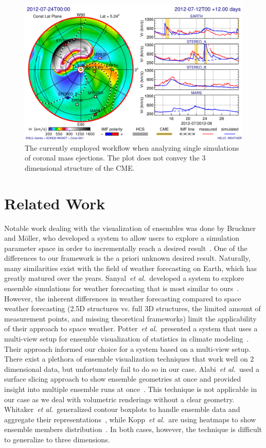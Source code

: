 \documentclass[journal]{vgtc}                %
\def\etal{\textit{et al.}}
\begin{document}
\begin{figure}
\newcommand{\abImageWidth}{0.9\columnwidth}
\centering
\includegraphics[width=\abImageWidth]{figures/current_workflow.png}
\caption{The currently employed workflow when analyzing single simulations of coronal mass ejections. The plot does not convey the 3 dimensional structure of the CME.}
\label{fig:currentworkflow:single}
\end{figure}

\section{Related Work}
 Notable work dealing with the visualization of ensembles was done by Bruckner and M\"oller, who developed a system to allow users to explore a simulation parameter space in order to incrementally reach a desired result~\cite{bruckner2010result}. One of the differences to our framework is the a priori unknown desired result. Naturally, many similarities exist with the field of weather forecasting on Earth, which has greatly matured over the years. Sanyal~\etal\ developed a system to explore ensemble simulations for weather forecasting that is most similar to ours~\cite{sanyal2010noodles}. However, the inherent differences in weather forecasting compared to space weather forecasting (2.5D structures vs. full 3D structures, the limited amount of measurement points, and missing theoretical frameworks) limit the applicability of their approach to space weather. Potter~\etal\ presented a system that uses a multi-view setup for ensemble visualization of statistics in climate modeling~\cite{potter2009ensemble}. Their approach informed our choice for a system based on a multi-view setup. There exist a plethora of ensemble visualization techniques that work well on 2 dimensional data, but unfortunately fail to do so in our case. Alabi~\etal\ used a surface slicing approach to show ensemble geometries at once and provided insight into multiple ensemble runs at once~\cite{alabi2012comparative}. This technique is not applicable in our case as we deal with volumetric renderings without a clear geometry. Whitaker~\etal\ generalized contour boxplots to handle ensemble data and aggregate their representations~\cite{whitaker2013contour}, while Kopp~\etal\ are using heatmaps to show ensemble members  distribution~\cite{kopp2014decision}. In both cases, however, the technique is difficult to generalize to three dimensions.
\end{document}
